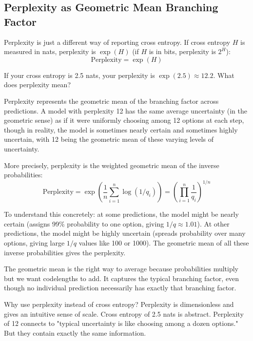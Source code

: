 \vspace{1.5em}

\subsection{Perplexity as Geometric Mean Branching Factor}

Perplexity is just a different way of reporting cross entropy. If cross entropy $H$ is measured in nats, perplexity is $\exp(H)$ (if $H$ is in bits, perplexity is $2^{H}$):
\begin{equation}
\text{Perplexity} = \exp(H)
\end{equation}

If your cross entropy is 2.5 nats, your perplexity is $\exp(2.5) \approx 12.2$. What does perplexity mean?

Perplexity represents the geometric mean of the branching factor across predictions. A model with perplexity 12 has the same average uncertainty (in the geometric sense) as if it were uniformly choosing among 12 options at each step, though in reality, the model is sometimes nearly certain and sometimes highly uncertain, with 12 being the geometric mean of these varying levels of uncertainty.

More precisely, perplexity is the weighted geometric mean of the inverse probabilities:
\begin{equation}
\text{Perplexity} = \exp\left(\frac{1}{n}\sum_{i=1}^{n} \log(1/q_i)\right) = \left(\prod_{i=1}^{n} \frac{1}{q_i}\right)^{1/n}
\end{equation}

To understand this concretely: at some predictions, the model might be nearly certain (assigns 99\% probability to one option, giving $1/q \approx 1.01$). At other predictions, the model might be highly uncertain (spreads probability over many options, giving large $1/q$ values like 100 or 1000). The geometric mean of all these inverse probabilities gives the perplexity.

The geometric mean is the right way to average because probabilities multiply but we want codelengths to add. It captures the typical branching factor, even though no individual prediction necessarily has exactly that branching factor.

Why use perplexity instead of cross entropy? Perplexity is dimensionless and gives an intuitive sense of scale. Cross entropy of 2.5 nats is abstract. Perplexity of 12 connects to "typical uncertainty is like choosing among a dozen options." But they contain exactly the same information.

